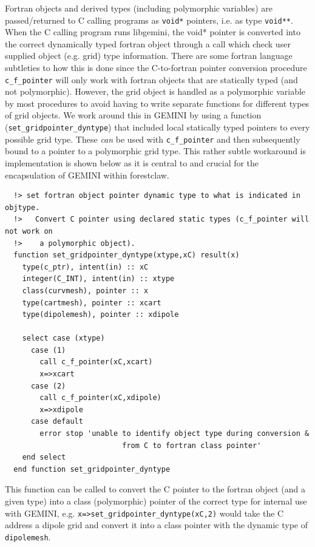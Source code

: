 \documentclass[11pt,letterpaper]{article}
\begin{document}
Fortran objects and derived types (including polymorphic variables) are passed/returned to C calling programs as \texttt{void*} pointers, i.e. as type \texttt{void**}.  When the C calling program runs libgemini, the void* pointer is converted into the correct dynamically typed fortran object through a call which check user supplied object (e.g. grid) type information.  There are some fortran language subtleties to how this is done since the C-to-fortran pointer conversion procedure \texttt{c\_f\_pointer} will only work with fortran objects that are statically typed (and not polymorphic).  However, the grid object is handled as a polymorphic variable by most procedures to avoid having to write separate functions for different types of grid objects.  We work around this in GEMINI by using a function (\texttt{set\_gridpointer\_dyntype}) that included local statically typed pointers to every possible grid type.  These \emph{can} be used with \texttt{c\_f\_pointer} and then subsequently bound to a pointer to a polymorphic grid type.  This rather subtle workaround is implementation is shown below as it is central to and crucial for the encapsulation of GEMINI within forestclaw.  

\begin{verbatim}
  !> set fortran object pointer dynamic type to what is indicated in objtype.  
  !>   Convert C pointer using declared static types (c_f_pointer will not work on 
  !>    a polymorphic object).
  function set_gridpointer_dyntype(xtype,xC) result(x)
    type(c_ptr), intent(in) :: xC
    integer(C_INT), intent(in) :: xtype
    class(curvmesh), pointer :: x
    type(cartmesh), pointer :: xcart
    type(dipolemesh), pointer :: xdipole

    select case (xtype)
      case (1)
        call c_f_pointer(xC,xcart)
        x=>xcart
      case (2)
        call c_f_pointer(xC,xdipole)
        x=>xdipole
      case default
        error stop 'unable to identify object type during conversion &
                           from C to fortran class pointer'
    end select
  end function set_gridpointer_dyntype
\end{verbatim}

This function can be called to convert the C pointer to the fortran object (and a given type) into a class (polymorphic) pointer of the correct type for internal use with GEMINI, e.g. \texttt{x=>set\_gridpointer\_dyntype(xC,2)} would take the C address a dipole grid and convert it into a class pointer with the dynamic type of \texttt{dipolemesh}.  
\end{document}
